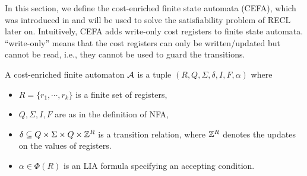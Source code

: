 %

In this section, we define the cost-enriched finite state automata (CEFA), which was introduced in \cite{atva2020} and will be used to solve the satisfiability problem of RECL later on. 
%
Intuitively, CEFA adds write-only cost registers to finite state automata. ``write-only'' means that the cost registers can only be written/updated but cannot be read, i.e., they cannot be used to guard the transitions. 

%
\vspace{-0.5mm}
\begin{definition}
  A cost-enriched finite automaton $\mathcal{A}$ is a tuple $(R, Q, \Sigma, \delta, I, F, \alpha)$ where
  \begin{itemize}
  \item $R = \{r_1, \cdots, r_k\}$ is a finite set of registers, 
    \item $Q, \Sigma, I, F$ are as in the definition of NFA,
    \item $\delta \subseteq Q \times \Sigma \times Q \times \mathbb{Z}^R$ is a transition relation, where $\mathbb{Z}^R$ denotes the updates on the values of registers.
    \item $\alpha \in \Phi(R)$ is an LIA formula specifying an accepting condition.
  \end{itemize}
\end{definition}
\vspace{-0.5mm}

